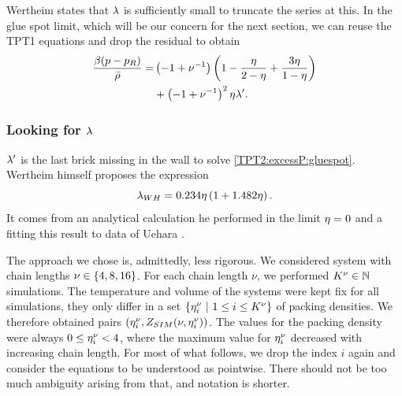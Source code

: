 \documentclass[8.5pt,twoside,twocolumn]{article}
\theoremstyle{standard}
\begin{document}
Wertheim states that $\lambda$ is sufficiently small to truncate the series at this.
In the glue spot limit, which will be our concern for the next section, we
can reuse the TPT1 equations and drop the residual to obtain
\begin{equation}
\begin{aligned}
\frac{\beta(p-p_R)}{\bar\rho}=&\left({-1+\nu^{-1}}\right)\left({1-\frac\eta{2-\eta}+\frac{3\eta}{1-\eta}}\right)\\
&+\left({-1+\nu^{-1}}\right)^2\eta\lambda'.
\end{aligned}
\label{TPT2:excessP:gluespot}
\end{equation}

\subsubsection{Looking for $\lambda$}
$\lambda'$ is the last brick missing in the wall to solve \eqref{TPT2:excessP:gluespot}. Wertheim himself
proposes the expression
\newcommand\lawh{\la_{WH}}
\newcommand\lao{\la_{opt}}
\newcommand\lanu{\la'_{\tilde \nu}}
\newcommand\laf{\la'_{4}}
\newcommand\lae{\la'_{8}}
\newcommand\las{\la'_{16}}
\newcommand\lai{\la'_{\infty}}
\newcommand\zsim{Z_{SIM}}
\newcommand\zr{Z_{R}}
\newcommand\enui{\e^\nu_i}
\begin{equation}
\lawh=0.234 \e\rb{1+1.482\e}.
\label{TPT:la:laWH}
\end{equation}
It comes from an analytical calculation he performed in the limit $\eta=0$ and
a fitting this result to data of Uehara \etal\cite{Uehara1979}.

The approach we chose is, admittedly, less rigorous. We considered system with chain
lengths \mbox{$\nu\in\left\{{4,8,16} \right\}$}.
For each chain length $\nu$, we performed $K^\nu\in\mathbb{N}$ simulations\cite{GrossSimRef}.
The temperature and volume of the systems were kept fix for all simulations, they only differ in a set
\mbox{$\st{\enui\ |\ 1 \le i \le K^\nu}$} of packing densities. We therefore obtained
pairs \mbox{$(\enui,\zsim(\nu,\e^\nu_i))$}. The values for the packing density were always 
$0\le\enui< 4$, where the maximum value for $\enui$ decreased with increasing chain length.
For most of what follows, we drop the index $i$ again and consider the equations to be
understood as pointwise. There should not be too much ambiguity arising from that, and notation
is shorter.
\end{document}
